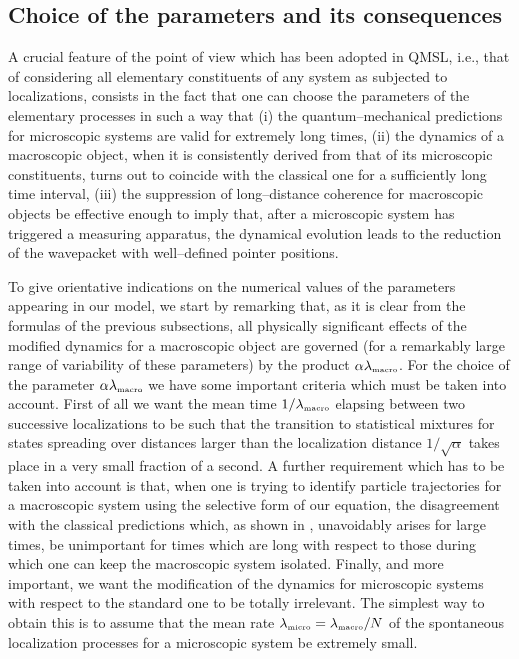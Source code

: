 \documentclass[10pt,a4paper]{article}
\begin{document}
\subsection{Choice of the parameters and its consequences}
\label{sec55}

A crucial feature of the point of view which has been adopted in
QMSL, i.e., that of considering all elementary constituents of any
system as subjected to localizations, consists in the fact that
one can choose the parameters of the elementary processes in such
a way that (i) the quantum--mechanical predictions for microscopic
systems are valid for extremely long times, (ii) the dynamics of a
macroscopic object, when it is consistently derived from that of
its microscopic constituents, turns out to coincide with the
classical one for a sufficiently long time interval, (iii) the
suppression of long--distance coherence for macroscopic objects be
effective enough to imply that, after a microscopic system has
triggered a measuring apparatus, the dynamical evolution leads to
the reduction of the wavepacket with well--defined pointer
positions.

To give orientative indications on the numerical values of the
parameters appearing in our model, we start by remarking that, as
it is clear from the formulas of the previous subsections, all
physically significant effects of the modified dynamics for a
macroscopic object are governed (for a remarkably large range of
variability of these parameters) by the product
$\alpha\lambda_{\makebox{\tiny macro}}$. For the choice of the
parameter $\alpha\lambda_{\makebox{\tiny macro}}$ we have some
important criteria which must be taken into account. First of all we want
the mean time $1/\lambda_{\makebox{\tiny macro}}$ elapsing between
two successive localizations to be such that the transition to
statistical mixtures for states spreading over distances larger
than the localization distance $1/\sqrt{\alpha}$ takes place in a
very small fraction of a second. A further requirement which has
to be taken into account is that, when one is trying to identify
particle trajectories for a macroscopic system using the selective
form of our equation, the disagreement with the classical
predictions which, as shown in \cite{grw}, unavoidably arises for
large times, be unimportant for times which are long with respect
to those during which one can keep the macroscopic system
isolated. Finally, and more important, we want  the
modification of the dynamics for microscopic systems with respect
to the standard one to be totally irrelevant. The simplest way to
obtain this is to assume that the mean rate
$\lambda_{\makebox{\tiny micro}} = \lambda_{\makebox{\tiny
macro}}/N$ of the spontaneous localization processes for a
microscopic system be extremely small.
\end{document}
